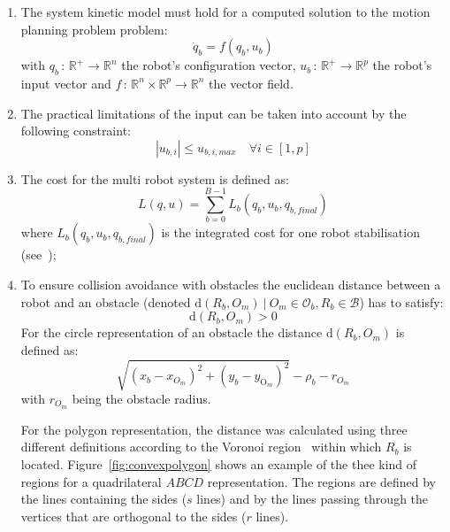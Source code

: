 \documentclass[eprint]{actapoly}
\begin{document}
\begin{enumerate}

    \item The system kinetic model must hold for a computed solution to the
    motion planning problem problem:
    \begin{equation}
        \dot{q}_b = f(q_b,u_b)
    \end{equation}
	with $q_b\,:\,\mathbb{R}^{+}\rightarrow \mathbb{R}^n$ the robot's configuration
	vector,
	$u_b\,:\,\mathbb{R}^{+}\rightarrow \mathbb{R}^p$ the robot's input vector and
	\mbox{$f\,:\,\mathbb{R}^{n}\times \mathbb{R}^{p}\rightarrow \mathbb{R}^n$} the
	vector field.
    
    \item The practical limitations of the input can be taken into account by the
    following constraint:
    \begin{equation}
        |u_{b,i}| \leq u_{b,i,max}\quad \forall i \in [1, p]
    \end{equation}
    
    \item The cost for the multi robot system is defined as:
    \begin{equation}
        L(q,u) = \sum_{b=0}^{B-1}L_b(q_b, u_b, q_{b,final})
    \end{equation}
    where $L_b(q_b, u_b, q_{b,final})$ is the integrated cost for one robot
    stabilisation (see~\cite{Deffort2009});
    
    
    \item 
    To ensure collision avoidance with obstacles the euclidean 
    distance between
    a robot and an obstacle (denoted $\mathrm{d}(R_b, O_m)\ |\ O_m
    \in \mathcal{O}_b, R_b \in \mathcal{B} $) has to satisfy:
    \begin{equation}
    	\mathrm{d}(R_b, O_m) > 0
    \end{equation}
    For the circle representation of an obstacle the distance
    $\mathrm{d}(R_b, O_m)$ is defined as:
    \begin{equation*}
        \sqrt{(x_{b} - x_{O_m})^2 + (y_{b} - y_{\mathrm{O}_m})^2}  - \rho_b - r_{O_m}
    \end{equation*}
    with $r_{O_m}$ being the obstacle radius.
    
    For the polygon representation, the distance was calculated using three different
    definitions according to the Voronoi region~\cite{ericson2004real}
    within which
    $R_b$ is located. Figure~\ref{fig:convexpolygon} shows an example of the thee kind
    of regions for a quadrilateral $ABCD$ representation. The regions are defined by
    the lines containing the sides ($s$ lines) and by the lines passing
    through the vertices that are orthogonal to the sides ($r$ lines).    
    

\end{enumerate}
\end{document}
